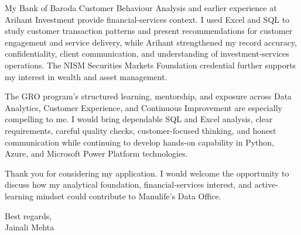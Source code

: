 \documentclass[letterpaper,11pt]{article}
\begin{document}
\bigbreak
My Bank of Baroda Customer Behaviour Analysis and earlier experience at Arihant Investment provide financial-services context. I used Excel and SQL to study customer transaction patterns and present recommendations for customer engagement and service delivery, while Arihant strengthened my record accuracy, confidentiality, client communication, and understanding of investment-services operations. The NISM Securities Markets Foundation credential further supports my interest in wealth and asset management.

\bigbreak
The GRO program's structured learning, mentorship, and exposure across Data Analytics, Customer Experience, and Continuous Improvement are especially compelling to me. I would bring dependable SQL and Excel analysis, clear requirements, careful quality checks, customer-focused thinking, and honest communication while continuing to develop hands-on capability in Python, Azure, and Microsoft Power Platform technologies.

\bigbreak
Thank you for considering my application. I would welcome the opportunity to discuss how my analytical foundation, financial-services interest, and active-learning mindset could contribute to Manulife's Data Office.

\bigbreak
Best regards,\\
Jainali Mehta
\end{document}
